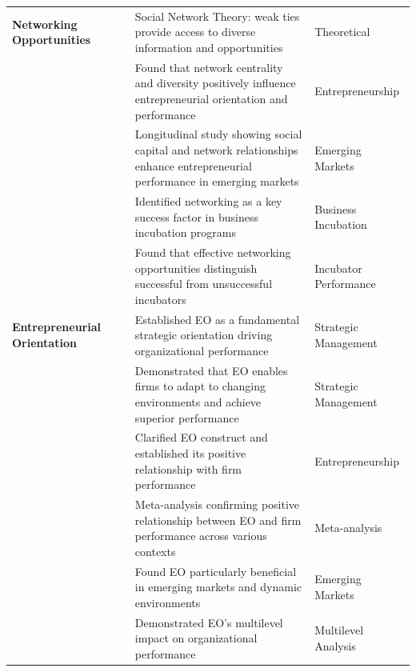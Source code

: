 \documentclass[../Main.tex]{subfiles}
\begin{document}
\begin{longtable}{|p{2.5cm}|p{3cm}|p{6cm}|p{2.5cm}|}
        \textbf{Networking Opportunities} & \cite{granovetter1973strength} & Social Network Theory: weak ties provide access to diverse information and opportunities & Theoretical \\
        & \cite{stam2008entrepreneurial} & Found that network centrality and diversity positively influence entrepreneurial orientation and performance & Entrepreneurship \\
        & \cite{batjargal2003social} & Longitudinal study showing social capital and network relationships enhance entrepreneurial performance in emerging markets & Emerging Markets \\
        & \cite{theodorakopoulos2014business} & Identified networking as a key success factor in business incubation programs & Business Incubation \\
        & \cite{harper2018makes} & Found that effective networking opportunities distinguish successful from unsuccessful incubators & Incubator Performance \\
        \hline
        
        \textbf{Entrepreneurial Orientation} & \cite{miller1983correlates} & Established EO as a fundamental strategic orientation driving organizational performance & Strategic Management \\
        & \cite{covin1989strategic} & Demonstrated that EO enables firms to adapt to changing environments and achieve superior performance & Strategic Management \\
        & \cite{lumpkin1996clarifying} & Clarified EO construct and established its positive relationship with firm performance & Entrepreneurship \\
        & \cite{rauch2009entrepreneurial} & Meta-analysis confirming positive relationship between EO and firm performance across various contexts & Meta-analysis \\
        & \cite{saeed2014entrepreneurial} & Found EO particularly beneficial in emerging markets and dynamic environments & Emerging Markets \\
        & \cite{wales2013entrepreneurial} & Demonstrated EO's multilevel impact on organizational performance & Multilevel Analysis \\
        \hline
        

\end{longtable}
\end{document}
